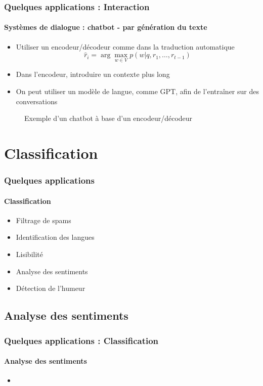 \documentclass[xcolor=table]{beamer}
\begin{document}
\begin{frame}
	\frametitle{Quelques applications : Interaction}
	\framesubtitle{Systèmes de dialogue : chatbot - par génération du texte}
	
	\begin{itemize}
		\item Utiliser un encodeur/décodeur comme dans la traduction automatique
		\[ \hat{r}_i = \arg\max_{w \in V} p(w| q, r_1, \ldots, r_{t-1}) \]
		
		\item Dans l'encodeur, introduire un contexte plus long
		
		\item On peut utiliser un modèle de langue, comme GPT, afin de l'entraîner sur des conversations
	\end{itemize}
	
	\begin{figure}
		\centering
		\caption{Exemple d'un chatbot à base d'un encodeur/décodeur \cite{2020-jurafsky-martin}}
	\end{figure}
	
\end{frame}


\section{Classification}

\begin{frame}
	\frametitle{Quelques applications}
	\framesubtitle{Classification}
	\begin{itemize}
		\item Filtrage de spams
		\item Identification des langues
		\item Lisibilité 
		\item Analyse des sentiments
		\item Détection de l'humeur
	\end{itemize}
\end{frame}

\subsection{Analyse des sentiments}

\begin{frame}
	\frametitle{Quelques applications : Classification}
	\framesubtitle{Analyse des sentiments}
	\begin{itemize}
		\item 
	\end{itemize}
\end{frame}
\end{document}
